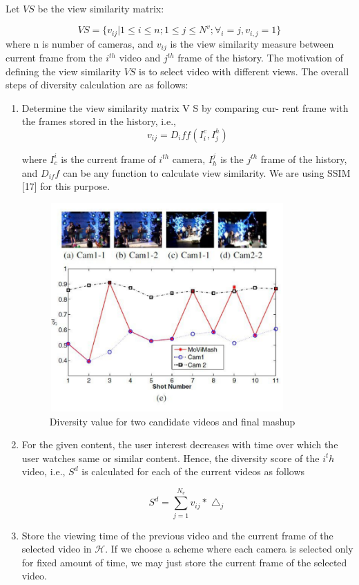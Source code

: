 \documentclass{sig-alternate}
\begin{document}
Let $V S$ be the view similarity matrix:

$$ V S = \{ v_{ij}|1 \leqslant i \leqslant n; 1 \leqslant j \leqslant N^v;  \forall_i=j,v_{i,j}  =1 \}  $$
 where n is number of cameras, and $v_{ij}$ is the view similarity
measure between current frame from the $i^{th}$ video and $j^{th}$ frame
of the history. The motivation of defining the view similarity $V S$ is
to select video with different views. The overall steps of diversity
calculation are as follows:


\begin{enumerate}
    \item  Determine the view similarity matrix V S by comparing cur-
rent frame with the frames stored in the history, i.e.,
  $$v_{ij}=D_iff(I^c_i,I^h_j)$$
  
  where $I^i_c$ is the current frame of $i^{th}$ camera, $I^j_h$ is the $j^{th}$ frame of the history, and $D_{if} f$ can be any function to calculate view similarity. We are using SSIM [17] for this purpose.
  
  
  \begin{figure}
\includegraphics[width=9cm, height=8cm]{video_3.pdf}
   \caption{ Diversity value for two candidate videos and final
mashup}

\end{figure}
  
  \item For the given content, the user interest decreases with time
over which the user watches same or similar content. Hence,
the diversity score of the $i^th$ video, i.e., $S^d$ is calculated for
each of the current videos as follows
 
  $$ S^d = \sum_{j=1}^{N_v}v_{ij}* \bigtriangleup_j $$

\item Store the viewing time of the previous video and the current
frame of the selected video in $\mathcal{H}$. If we choose a scheme
where each camera is selected only for fixed amount of time,
we may just store the current frame of the selected video.
\end{enumerate}
\end{document}

